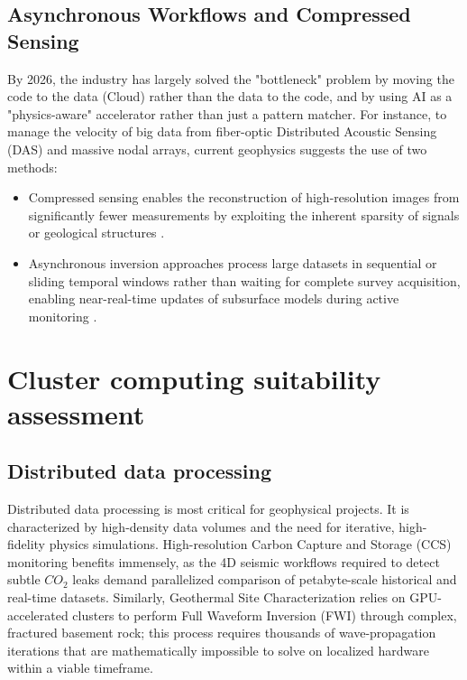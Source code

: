\documentclass[data,article,submit,pdftex,moreauthors]{Definitions/mdpi}
\begin{document}
\subsection{Asynchronous Workflows and Compressed Sensing}

By 2026, the industry has largely solved the "bottleneck" problem by moving the code to the data (Cloud) rather than the data to the code, and by using AI as a "physics-aware" accelerator rather than just a pattern matcher. For instance, to manage the velocity of big data from fiber-optic Distributed Acoustic Sensing (DAS) and massive nodal arrays, current geophysics suggests the use of two methods:
\begin{itemize}
	\item Compressed sensing enables the reconstruction of high-resolution images from significantly fewer measurements by exploiting the inherent sparsity of signals or geological structures \cite{Candes2006,Donoho2006,Herrmann2012}.
	\item Asynchronous inversion approaches process large datasets in sequential or sliding temporal windows rather than waiting for complete survey acquisition, enabling near-real-time updates of subsurface models during active monitoring \cite{Gineste2021,Wilkinson2022,Minson2014}.
\end{itemize}

\section{Cluster computing suitability assessment}

\subsection{Distributed data processing}

Distributed data processing is most critical for geophysical projects. It is characterized by high-density data volumes and the need for iterative, high-fidelity physics simulations. High-resolution Carbon Capture and Storage (CCS) monitoring benefits immensely, as the 4D seismic workflows required to detect subtle $CO_2$ leaks demand parallelized comparison of petabyte-scale historical and real-time datasets. Similarly, Geothermal Site Characterization relies on GPU-accelerated clusters to perform Full Waveform Inversion (FWI) through complex, fractured basement rock; this process requires thousands of wave-propagation iterations that are mathematically impossible to solve on localized hardware within a viable timeframe. 
\end{document}
